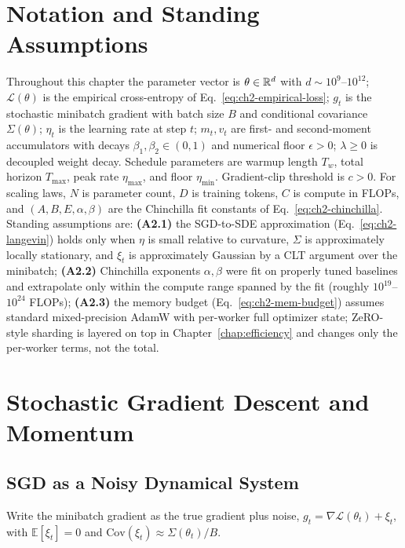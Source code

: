 \section{Notation and Standing Assumptions}
\label{sec:ch2-notation}

\begin{notationbox}
Throughout this chapter the parameter vector is
$\theta \in \mathbb{R}^{d}$ with $d \sim 10^{9}$--$10^{12}$; $\mathcal{L}(\theta)$
is the empirical cross-entropy of Eq.~\eqref{eq:ch2-empirical-loss};
$g_t$ is the stochastic minibatch gradient with batch size $B$ and
conditional covariance $\Sigma(\theta)$; $\eta_t$ is the learning rate
at step $t$; $m_t, v_t$ are first- and second-moment accumulators with
decays $\beta_1, \beta_2 \in (0,1)$ and numerical floor
$\epsilon > 0$; $\lambda \ge 0$ is decoupled weight decay. Schedule
parameters are warmup length $T_w$, total horizon $T_{\max}$, peak
rate $\eta_{\max}$, and floor $\eta_{\min}$. Gradient-clip threshold
is $c > 0$. For scaling laws, $N$ is parameter count, $D$ is training
tokens, $C$ is compute in FLOPs, and $(A, B, E, \alpha, \beta)$ are
the Chinchilla fit constants of Eq.~\eqref{eq:ch2-chinchilla}.
Standing assumptions are:
\textbf{(A2.1)} the SGD-to-SDE approximation
(Eq.~\eqref{eq:ch2-langevin}) holds only when $\eta$ is small
relative to curvature, $\Sigma$ is approximately locally stationary,
and $\xi_t$ is approximately Gaussian by a CLT argument over the
minibatch;
\textbf{(A2.2)} Chinchilla exponents $\alpha, \beta$ were fit on
properly tuned baselines and extrapolate only within the compute range
spanned by the fit (roughly $10^{19}$--$10^{24}$ FLOPs);
\textbf{(A2.3)} the memory budget
(Eq.~\eqref{eq:ch2-mem-budget}) assumes standard mixed-precision
AdamW with per-worker full optimizer state; ZeRO-style sharding is
layered on top in Chapter~\ref{chap:efficiency} and changes only the per-worker terms, not
the total.
\end{notationbox}

\section{Stochastic Gradient Descent and Momentum}

\subsection{SGD as a Noisy Dynamical System}

Write the minibatch gradient as the true gradient plus noise,
$g_t = \nabla \mathcal{L}(\theta_t) + \xi_t$, with
$\mathbb{E}[\xi_t]=0$ and $\mathrm{Cov}(\xi_t) \approx \Sigma(\theta_t)/B$.

